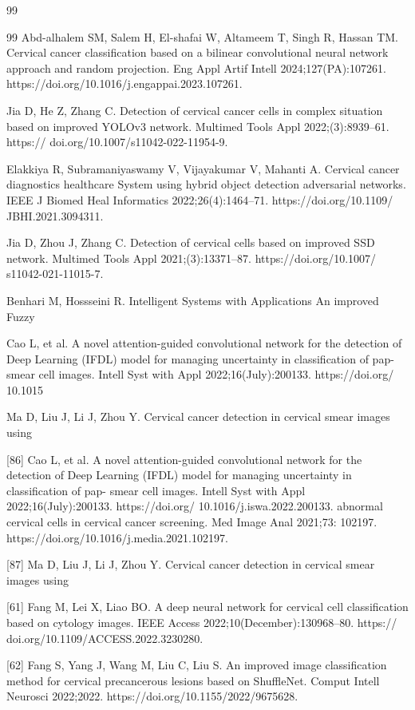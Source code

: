 \documentclass{svjour3}
\begin{document}
\begin{thebibliography}{99}
\begin{thebibliography}{99}
 Abd-alhalem SM, Salem H, El-shafai W, Altameem T, Singh R, Hassan TM. Cervical cancer classification based on a bilinear convolutional neural network approach and random projection. Eng Appl Artif Intell 2024;127(PA):107261. https://doi.org/10.1016/j.engappai.2023.107261.

 Jia D, He Z, Zhang C. Detection of cervical cancer cells in complex situation based on improved YOLOv3 network. Multimed Tools Appl 2022;(3):8939–61. https:// doi.org/10.1007/s11042-022-11954-9.

 Elakkiya R, Subramaniyaswamy V, Vijayakumar V, Mahanti A. Cervical cancer diagnostics healthcare System using hybrid object detection adversarial networks. IEEE J Biomed Heal Informatics 2022;26(4):1464–71. https://doi.org/10.1109/ JBHI.2021.3094311.

 Jia D, Zhou J, Zhang C. Detection of cervical cells based on improved SSD network. Multimed Tools Appl 2021;(3):13371–87. https://doi.org/10.1007/ s11042-021-11015-7.

 Benhari M, Hossseini R. Intelligent Systems with Applications An improved Fuzzy

 Cao L, et al. A novel attention-guided convolutional network for the detection of Deep Learning (IFDL) model for managing uncertainty in classification of pap- smear cell images. Intell Syst with Appl 2022;16(July):200133. https://doi.org/ 10.1015

 Ma D, Liu J, Li J, Zhou Y. Cervical cancer detection in cervical smear images using

 [86] Cao L, et al. A novel attention-guided convolutional network for the detection of Deep Learning (IFDL) model for managing uncertainty in classification of pap- smear cell images. Intell Syst with Appl 2022;16(July):200133. https://doi.org/ 10.1016/j.iswa.2022.200133. abnormal cervical cells in cervical cancer screening. Med Image Anal 2021;73: 102197. https://doi.org/10.1016/j.media.2021.102197.

 [87] Ma D, Liu J, Li J, Zhou Y. Cervical cancer detection in cervical smear images using

 [61] Fang M, Lei X, Liao BO. A deep neural network for cervical cell classification based on cytology images. IEEE Access 2022;10(December):130968–80. https:// doi.org/10.1109/ACCESS.2022.3230280.

 [62] Fang S, Yang J, Wang M, Liu C, Liu S. An improved image classification method for cervical precancerous lesions based on ShuffleNet. Comput Intell Neurosci 2022;2022. https://doi.org/10.1155/2022/9675628.


\end{thebibliography}
\end{thebibliography}
\end{document}
